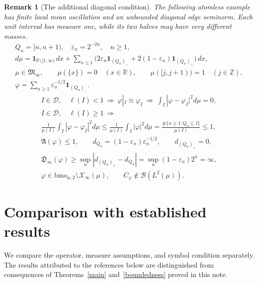 \documentclass[11pt]{amsart}
\newtheorem{remark}[theorem]{Remark}
\newcommand{\D}{\mathcal D}
\newcommand{\X}{\mathcal X}
\begin{document}
\begin{remark}[The additional diagonal condition]
The following atomless example has finite local mean oscillation
and an unbounded diagonal edge seminorm. Each unit interval has
measure one, while its two halves may have very different masses.
\begin{gather*}
 Q_n=[n,n+1),\quad\varepsilon_n=2^{-2n},\quad n\ge1,\\
 d\mu=\mathbf1_{\mathbb R\setminus[1,\infty)}\,dx
      +\sum_{n\ge1}\big(2\varepsilon_n\mathbf1_{(Q_n)_-}
              +2(1-\varepsilon_n)\mathbf1_{(Q_n)_+}\big)\,dx,\\
 \mu\in\mathfrak M_\infty,\qquad\mu(\{x\})=0\quad(x\in\mathbb R),
 \qquad \mu([j,j+1))=1\quad(j\in\mathbb Z),\\
 \varphi=\sum_{n\ge1}\varepsilon_n^{-1/2}\mathbf1_{(Q_n)_-}.
\end{gather*}
\begin{gather*}
 I\in\D,\quad\ell(I)<1
 \ \Longrightarrow\
 \varphi|_I\equiv\varphi_I
 \ \Longrightarrow\ \int_I|\varphi-\varphi_I|^2d\mu=0,\\
 I\in\D,\quad\ell(I)\ge1
 \ \Longrightarrow\\
 \frac1{\mu(I)}\int_I|\varphi-\varphi_I|^2d\mu
 \le\frac1{\mu(I)}\int_I|\varphi|^2d\mu
 =\frac{\#\{n\ge1:Q_n\subseteq I\}}{\mu(I)}\le1,\\
 \mathfrak A(\varphi)\le1,\qquad
 d_{Q_n}=(1-\varepsilon_n)\varepsilon_n^{-1/2},\qquad
 d_{(Q_n)_+}=0,\\
 \mathfrak D_\infty(\varphi)
 \ge\sup_n|d_{(Q_n)_+}-d_{Q_n}|
 =\sup_n(1-\varepsilon_n)2^n=\infty,\\
 \varphi\in\mathrm{bmo}_{\mu,2}\setminus\X_\infty(\mu),\qquad
 C_\varphi\notin\mathcal B(L^2(\mu)).
\end{gather*}
\end{remark}

\section{Comparison with established results}\label{sec-comparison}
We compare the operator, measure assumptions, and symbol condition
separately. The results attributed to the references below are
distinguished from consequences of Theorems~\ref{main}
and~\ref{boundedness} proved in this note.
\end{document}
